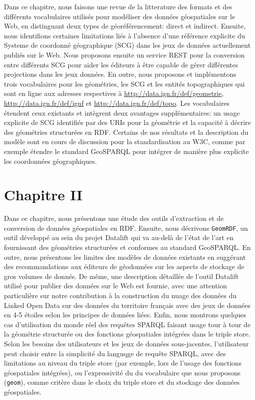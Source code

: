 \documentclass[a4paper,11pt,twoside]{report}
\begin{document}
Dans ce chapitre, nous faisons une revue de la litterature des formats et des différents vocabulaires utilisés pour modéliser des données géospatiales sur le Web, en distinguant deux types de géoréférencement: direct et indirect. Ensuite, nous identifions certaines limitations liés à l'absence d'une référence explicite du Systeme de coordonné géographique (SCG) dans les jeux de données actuellement publiés sur le Web. Nous proposons ensuite un service REST pour la conversion entre différents SCG pour aider les éditeurs à être capable de gérer différentes projections dans les jeux données. En outre, nous proposons et implémentons trois vocabulaires pour les géométries, les SCG et les entités topographiques qui sont en ligne aux adresses respectives à \url{http://data.ign.fr/def/geometrie}, \url{http://data.ign.fr/def/ignf} et \url{http://data.ign.fr/def/topo}. Les vocabulaires étendent ceux existants et intègrent deux avantages supplémentaires: un usage explicite de SCG identifiés par des URIs pour la géométrie et la capacité à décrire des géométries structurées en RDF. Certains de nos résultats et la description du modèle sont en cours de discussion pour la standardisation au W3C, comme par exemple étendre le standard  GeoSPARQL pour intégrer de manière plus explicite les coordonnées géographiques. 



\section*{Chapitre II}


Dans ce chapitre, nous présentons une étude des outils d'extraction et de conversion de données géospatiales en RDF. Ensuite, nous décrivons \texttt{GeomRDF}, un outil développé au sein du projet Datalift qui va au-delà de l'état de l'art en fournissant des géométries structurées et conformes au standard GeoSPARQL. En outre, nous présentons les limites des modèles de données existants en suggérant des recommandations aux éditeurs de géodonnées sur les aspects de stockage de gros volumes de donnés. De même, une description détaillée de l'outil Datalift utilisé pour publier des données sur le Web est fournie, avec une attention particulière sur notre contribution à la construction du nuage des données du Linked Open Data sur des données du territoire français avec des jeux de données en 4-5 étoiles selon les principes de données liées. Enfin, nous montrons quelques cas d'utilisation du monde réel des requêtes SPARQL faisant usage tour à tour de la géométrie structurée ou des fonctions géospatiales intégrées dans le triple store. Selon les besoins des utilisateurs et les jeux de données sous-jacentes, l'utilisateur peut choisir entre la simplicité du languqge de requête SPARQL, avec des limitations au niveau du triple store (par exemple, lors de l'usage des fonctions géospatiales intégrées), ou l'expressivité du du vocabulaire que nous proposons (\texttt{geom}), comme critère dans le choix du triple store et du stockage des données géospatiales.
\end{document}
